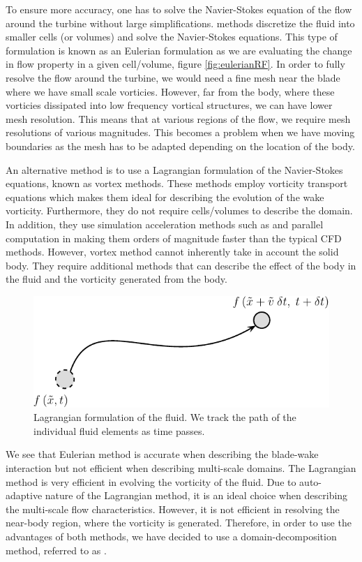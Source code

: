 To ensure more accuracy, one has to solve the Navier-Stokes equation of the flow around the turbine without large simplifications.  methods discretize the fluid into smaller cells (or volumes) and solve the Navier-Stokes equations. This type of formulation is known as an Eulerian formulation as we are evaluating the change in flow property in a given cell/volume, figure \ref{fig:eulerianRF}. In order to fully resolve the flow around the turbine, we would need a fine mesh near the blade where we have small scale vorticies. However, far from the body, where these vorticies dissipated into low frequency vortical structures, we can have lower mesh resolution. This means that at various regions of the flow, we require mesh resolutions of various magnitudes. This becomes a problem when we have moving boundaries as the mesh has to be adapted depending on the location of the body.

An alternative method is to use a Lagrangian formulation of the Navier-Stokes equations, known as vortex methods. These methods employ vorticity transport equations which makes them ideal for describing the evolution of the wake vorticity. Furthermore, they do not require cells/volumes to describe the domain. In addition, they use simulation acceleration methods such as  and parallel computation in  making them orders of magnitude faster than the typical CFD methods. However, vortex method cannot inherently take in account the solid body. They require additional methods that can describe the effect of the body in the fluid and the vorticity generated from the body.

	\begin{figure}[!t]
		\centering
		\includegraphics[width=0.4\linewidth]{figures/introduction/lagrangianRF2-crop.pdf}
		\caption{Lagrangian formulation of the fluid. We track the path of the individual fluid elements as time passes.}
		\label{fig:lagrangianRF}
	\end{figure}

We see that Eulerian method is accurate when describing the blade-wake interaction but not efficient when describing multi-scale domains. The Lagrangian method is very efficient in evolving the vorticity of the fluid. Due to auto-adaptive nature of the Lagrangian method, it is an ideal choice when describing the multi-scale flow characteristics. However, it is not efficient in resolving the near-body region, where the vorticity is generated. Therefore, in order to use the advantages of both methods, we have decided to use a domain-decomposition method, referred to as . 

